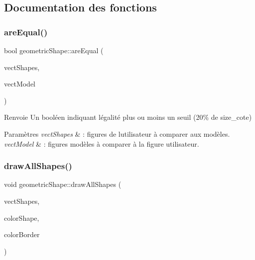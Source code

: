 \subsection{Documentation des fonctions}
\mbox{\label{namespacegeometric_shape_ac696d1fa878ce8e5aac23407fe3483f0}} 
\subsubsection{\texorpdfstring{are\+Equal()}{areEqual()}}
{\footnotesize\ttfamily bool geometric\+Shape\+::are\+Equal (\begin{DoxyParamCaption}\item[{const std\+::vector$<$ std\+::shared\+\_\+ptr$<$ \hyperlink{classgeometric_shape_1_1_shape}{geometric\+Shape\+::\+Shape} $>$$>$ \&}]{vect\+Shapes,  }\item[{const std\+::vector$<$ std\+::shared\+\_\+ptr$<$ \hyperlink{classgeometric_shape_1_1_shape}{geometric\+Shape\+::\+Shape} $>$$>$ \&}]{vect\+Model }\end{DoxyParamCaption})}

\begin{DoxyReturn}{Renvoie}
Un booléen indiquant l\textquotesingle{}égalité plus ou moins un seuil (20\% de size\+\_\+cote) 
\end{DoxyReturn}

\begin{DoxyParams}{Paramètres}
{\em vect\+Shapes} & \+: figures de l\textquotesingle{}utilisateur à comparer aux modèles. \\
\hline
{\em vect\+Model} & \+: figures modèles à comparer à la figure utilisateur. \\
\hline
\end{DoxyParams}
\mbox{\label{namespacegeometric_shape_a3f737265078bd7963e0398d2035f0efc}} 
\subsubsection{\texorpdfstring{draw\+All\+Shapes()}{drawAllShapes()}\hspace{0.1cm}{\footnotesize\ttfamily [1/2]}}
{\footnotesize\ttfamily void geometric\+Shape\+::draw\+All\+Shapes (\begin{DoxyParamCaption}\item[{const std\+::vector$<$ std\+::shared\+\_\+ptr$<$ \hyperlink{classgeometric_shape_1_1_shape}{geometric\+Shape\+::\+Shape} $>$$>$ \&}]{vect\+Shapes,  }\item[{M\+L\+V\+\_\+\+Color}]{color\+Shape,  }\item[{M\+L\+V\+\_\+\+Color}]{color\+Border }\end{DoxyParamCaption})}


